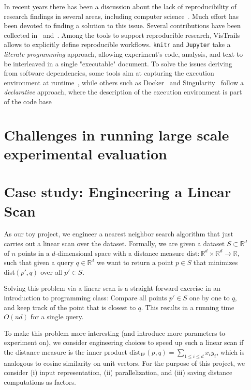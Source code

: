 \documentclass{llncs}
\begin{document}
In recent years there has been a discussion about the lack of reproducibility
of research findings in several areas, including 
computer science~\cite{DBLP:journals/cacm/CollbergP16,Hutson725}.
Much effort has been devoted to finding a solution to this issue. Several
contributions have been collected in~\cite{stodden2014implementing} 
and~\cite{kitzes2017practice}.
Among the tools to support reproducible research, 
VisTrails~\cite{DBLP:conf/sigmod/CallahanFSSSV06} allows to
explicitly define reproducible workflows.
\texttt{knitr} and \texttt{Jupyter} take a \emph{literate programming}
approach, allowing experiment's code, analysis, and text to be interleaved
in a single "executable" document.
To solve the issues deriving from software dependencies,
some tools aim at capturing the execution
environment at runtime~\cite{DBLP:journals/cse/Guo12,davison2014sumatra,DBLP:journals/jossw/RampinCSFS16},
while others such as Docker~\cite{DBLP:journals/sigops/Boettiger15}
and Singularity~\cite{kurtzer2017singularity} follow a \emph{declarative}
approach, where the description of the execution environment is part
of the code base


\section{Challenges in running large scale experimental evaluation}



\section{Case study: Engineering a Linear Scan}

As our toy project, we engineer a nearest neighbor search algorithm that just carries out a linear scan over the dataset. 
Formally, we are given a dataset $S \subset \mathbb{R}^d$ of $n$ points in a $d$-dimensional space with a distance measure $\text{dist}\colon \mathbb{R}^d \times \mathbb{R}^d \rightarrow \mathbb{R}$, such that given a query $q \in \mathbb{R}^d$ we want to return a point $p \in S$ that minimizes dist$(p', q)$ over all $p' \in S$.

Solving this problem via a linear scan is a straight-forward exercise in an introduction to programming class: Compare all points $p' \in S$ one by one to $q$, and keep track of the point that is closest to $q$. This results in a running time $O(nd)$ for a single query.

To make this problem more interesting (and introduce more parameters to experiment on), we consider engineering choices to speed up such a linear scan if the distance measure is the inner product $\text{dist}_{\text{IP}}(p,q) = \sum_{1 \leq i \leq d} x_i y_i$, which is analogous to cosine similarity on unit vectors. For the purpose of this project, we consider (i) input representation, (ii) parallelization, and (iii) saving distance computations as factors.
\end{document}

